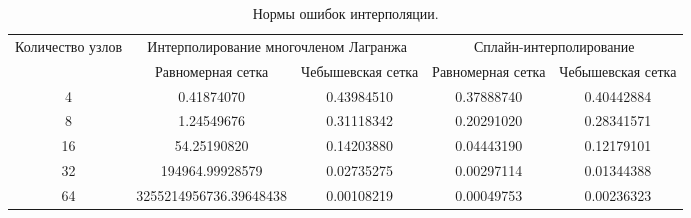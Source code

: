 \documentclass[12pt, a4paper]{article}
\begin{document}
	\begin{table}[H]
		\caption{Нормы ошибок интерполяции.}
		\centering
		\footnotesize
		\begin{tabular}{|c|c|c|c|c|}
			\hline
			\multirow{2}{5em}{Количество узлов} & \multicolumn{2}{|c|}{Интерполирование многочленом Лагранжа}&\multicolumn{2}{|c|}{Сплайн-интерполирование}\\
			\cline{2-5}
			&Равномерная сетка &Чебышевская сетка &Равномерная сетка&Чебышевская сетка\\
			\hline
			4& 0.41874070&0.43984510&0.37888740&0.40442884\\
			\hline
			8&1.24549676&0.31118342&0.20291020&0.28341571\\
			\hline
			16&54.25190820&0.14203880&0.04443190& 0.12179101\\
			\hline
			32&194964.99928579&0.02735275&0.00297114&0.01344388\\
			\hline
			64&3255214956736.39648438&0.00108219&0.00049753&0.00236323\\
			\hline
		\end{tabular}
	\end{table}
	
\end{document}
